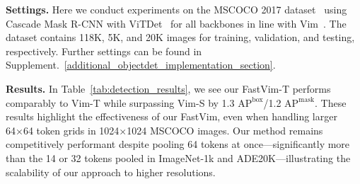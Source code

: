 \noindent \textbf{Settings.} Here we conduct experiments on the MSCOCO 2017 dataset~\cite{coco} using Cascade Mask R-CNN with ViTDet~\cite{vitdet} for all backbones in line with Vim~\cite{vim}. The dataset contains 118K, 5K, and 20K images for training, validation, and testing, respectively. Further settings can be found in Supplement.~\ref{additional_objectdet_implementation_section}.


\begin{table}[ht]
\caption{Object detection and instance segmentation benchmarks on COCO dataset using Cascaded Mask R-CNN~\cite{mask_rcnn} framework. $^*$detection transfer conducted using provided Vim-S (GitHub).}
\vspace{-6pt}
    \begin{center}
\end{center}
\vspace{-6pt}
    \label{tab:detection_results}

\end{table}

\noindent \textbf{Results.} In Table~\ref{tab:detection_results}, we see our FastVim-T performs comparably to Vim-T while surpassing Vim-S by 1.3 $\text{AP}^\text{box}$/1.2 $\text{AP}^\text{mask}$. These results highlight the effectiveness of our FastVim, even when handling larger 64×64 token grids in 1024×1024 MSCOCO images. Our method remains competitively performant despite pooling 64 tokens at once—significantly more than the 14 or 32 tokens pooled in ImageNet-1k and ADE20K—illustrating the scalability of our approach to higher resolutions.

